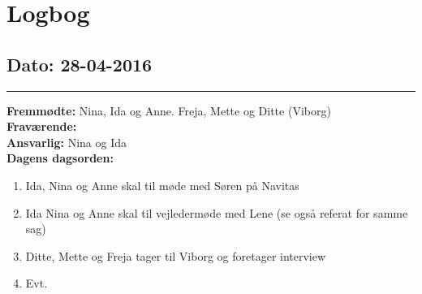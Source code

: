 \chapter{Logbog}
\section{Dato: 28-04-2016}
\hrule
\textbf{Fremmødte:} Nina, Ida og Anne. Freja, Mette og Ditte (Viborg) \\
\textbf{Fraværende: } \\
\textbf{Ansvarlig:} Nina og Ida  \\
\textbf{Dagens dagsorden: }
\begin{enumerate}
	\item Ida, Nina og Anne skal til møde med Søren på Navitas
	\item Ida Nina og Anne skal til vejledermøde med Lene (se også referat for samme sag)
	\item Ditte, Mette og Freja tager til Viborg og foretager interview
	\item Evt. 
\end{enumerate}

